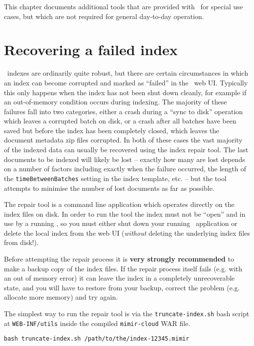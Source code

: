 This chapter documents additional tools that are provided with \Mimir\ for
special use cases, but which are not required for general day-to-day operation.

\section{Recovering a failed index}\label{sec:tools:repair}

\Mimir\ indexes are ordinarily quite robust, but there are certain
circumstances in which an index can become corrupted and marked as ``failed''
in the \Mimir\ web UI.  Typically this only happens when the index has not been
shut down cleanly, for example if an out-of-memory condition occurs during
indexing.  The majority of these failures fall into two categories, either a
crash during a ``sync to disk'' operation which leaves a corrupted batch on
disk, or a crash after all batches have been saved but before the index has
been completely closed, which leaves the document metadata zip files corrupted.
In both of these cases the vast majority of the indexed data can usually be
recovered using the index repair tool.  The last documents to be indexed will
likely be lost -- exactly how many are lost depends on a number of factors
including exactly when the failure occurred, the length of the
\verb!timeBetweenBatches! setting in the index template, etc. -- but the tool
attempts to minimise the number of lost documents as far as possible.

The repair tool is a command line application which operates directly on the
index files on disk.  In order to run the tool the index must not be ``open''
and in use by a running \Mimir{}, so you must either shut down your running
\Mimir\ application or delete the local index from the web UI (\emph{without}
deleting the underlying index files from disk!).

Before attempting the repair process it is {\bf very strongly recommended} to
make a backup copy of the index files.  If the repair process itself fails
(e.g. with an out of memory error) it can leave the index in a completely
unrecoverable state, and you will have to restore from your backup, correct the
problem (e.g. allocate more memory) and try again.

The simplest way to run the repair tool is via the \verb!truncate-index.sh!
bash script at \verb!WEB-INF/utils! inside the compiled \verb!mimir-cloud!  WAR
file.

\begin{verbatim}
bash truncate-index.sh /path/to/the/index-12345.mimir
\end{verbatim}

